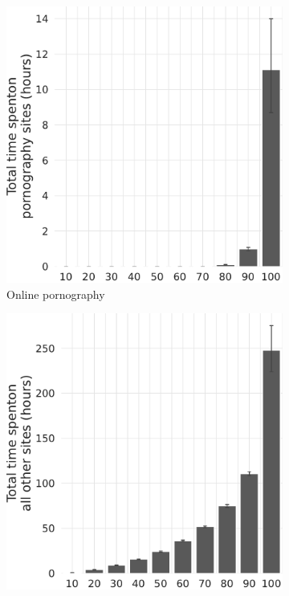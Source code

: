 \documentclass[12pt,twoside]{article}
\begin{document}
\begin{figure}[!ht]
\caption{Hours Spent on Online Pornography and All Other Online Content}
\label{fig:distribution_duration_on_adultsites_fullsample}
     \centering
     \begin{subfigure}[b]{0.495\textwidth}
         \centering
         \includegraphics[width=\textwidth]{figs/distribution_duration_on_adultsites_fullsample.pdf}
         \caption{Online pornography}
     \end{subfigure}
     \hfill
     \begin{subfigure}[b]{0.495\textwidth}
         \centering
         \includegraphics[width=\textwidth]{figs/distribution_duration_on_nonadultsites_fullsample.pdf}

\end{subfigure}
\end{figure}
\end{document}
